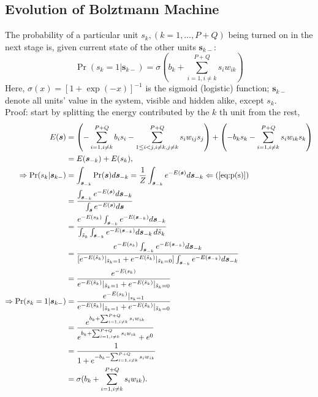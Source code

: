 \documentclass[11pt]{article}
\newcommand{\vs}{\boldsymbol{s}}
\begin{document}
\subsection{Evolution of Bolztmann Machine}
The probability of a particular unit $s_k, (k = 1, \dots, P+Q)$ being turned on in the next stage is, given current state of the other units $\vs_{k-}$:
\begin{equation}\label{eq:p(s_k=1)}
  \Pr(s_k = 1|\vs_{k-}) = \sigma(b_k + \sum_{i=1, i \ne k}^{P+Q}{s_i w_{ik}})
\end{equation}
Here,  $\sigma(x) = [1 + \exp({-x})]^{-1}$ is the sigmoid (logistic) function; $\vs_{k-}$ denote all units' value in the system, visible and hidden alike, except $s_k$. \\
Proof: start by splitting the energy contributed by the $k$ th unit from the rest,
\newcommand{\st}{\tilde{s}}
\begin{align*}
  E(\vs)
  & = \left( -\sum_{i=1, i \ne k}^{P+Q} b_i s_i - \sum_{1 \le i < j, i \ne k, j \ne k}^{P+Q} s_i w_{ij} s_j \right) + \left(-b_k s_k - \sum_{i=1, i \ne k}^{P+Q}s_i w_{ik} s_k \right) \\
  & = E(\vs_{-k}) + E(s_k), \\
  \Rightarrow \Pr(s_k | \vs_{k-})
  & = \int_{\vs_{-k}} \Pr(\vs) d\vs_{-k} = \frac{1}{Z} \int_{\vs_{-k}} e^{-E(\vs)} d\vs_{-k} \Leftarrow (\ref{eq:p(s)}) \\
  & = \frac{\int_{\vs_{-k}} e^{-E(\vs)} d\vs_{-k}}{\int_{\vs} e^{-E(\vs)} d\vs} \\
  & = \frac{e^{-E(s_k)} \int_{\vs_{-k}} e^{-E(\vs_{-k})} d\vs_{-k}}  {\int_{\st_k} \int_{\vs_{-k}} e^{-E(\vs_{-k})} d\vs_{-k}\,d\st_k} \\
  & = \frac{e^{-E(s_k)} \int_{\vs_{-k}} e^{-E(\vs_{-k})} d\vs_{-k}}  {[e^{-E(\st_k)}|_{\st_k=1} + e^{-E(\st_k)}|_{\st_k=0}] \int_{\vs_{-k}} e^{-E(\vs_{-k})} d\vs_{-k}} \\
  & = \frac{e^{-E(s_k)}}{e^{-E(\st_k)}|_{\st_k=1} + e^{-E(\st_k)}|_{\st_k=0}} \\
  \Rightarrow \Pr(s_k=1 | \vs_{k-})
  & = \frac{e^{-E(s_k)}|_{s_k=1}}{e^{-E(\st_k)}|_{\st_k=1} + e^{-E(\st_k)}|_{\st_k=0}} \\
  & = \frac{e^{b_k + \sum_{i=1, i \ne k}^{P+Q}{s_i w_{ik}}}}{e^{b_k + \sum_{i=1, i \ne k}^{P+Q}{s_i w_{ik}}} + e^{0}} \\
  & = \frac{1}{1 + e^{-b_k - \sum_{i=1, i \ne k}^{P+Q}{s_i w_{ik}}}} \\
  & = \sigma(b_k + \sum_{i=1, i \ne k}^{P+Q}{s_i w_{ik}}).
\end{align*}
\end{document}
